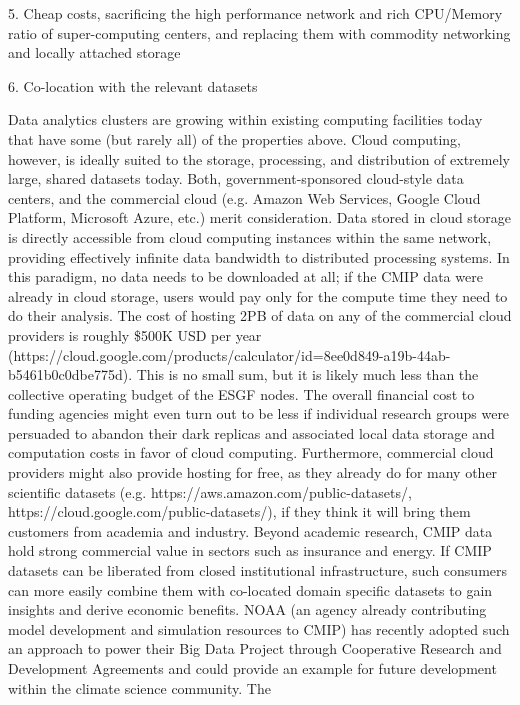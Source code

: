 \documentclass[gmd,manuscript]{copernicus}
\begin{document}
\begin{enumerate}[label=SC1-\arabic*,leftmargin=*]
  5. Cheap costs, sacrificing the high performance network and rich
  CPU/Memory ratio of super-computing centers, and replacing them with
  commodity networking and locally attached storage

  6. Co-location with the relevant datasets

  Data analytics clusters are growing within existing computing
  facilities today that have some (but rarely all) of the properties
  above. Cloud computing, however, is ideally suited to the storage,
  processing, and distribution of extremely large, shared datasets
  today. Both, government-sponsored cloud-style data centers, and the
  commercial cloud (e.g. Amazon Web Services, Google Cloud Platform,
  Microsoft Azure, etc.) merit consideration. Data stored in cloud
  storage is directly accessible from cloud computing instances within
  the same network, providing effectively infinite data bandwidth to
  distributed processing systems. In this paradigm, no data needs to
  be downloaded at all; if the CMIP data were already in cloud
  storage, users would pay only for the compute time they need to do
  their analysis. The cost of hosting 2PB of data on any of the
  commercial cloud providers is roughly \$500K USD per year
  (https://cloud.google.com/products/calculator/id=8ee0d849-a19b-44ab-b5461b0c0dbe775d).
  This is no small sum, but it is likely much less than the collective
  operating budget of the ESGF nodes. The overall financial cost to
  funding agencies might even turn out to be less if individual
  research groups were persuaded to abandon their dark replicas and
  associated local data storage and computation costs in favor of
  cloud computing. Furthermore, commercial cloud providers might also
  provide hosting for free, as they already do for many other
  scientific datasets (e.g. https://aws.amazon.com/public-datasets/,
  https://cloud.google.com/public-datasets/), if they think it will
  bring them customers from academia and industry. Beyond academic
  research, CMIP data hold strong commercial value in sectors such as
  insurance and energy. If CMIP datasets can be liberated from closed
  institutional infrastructure, such consumers can more easily combine
  them with co-located domain specific datasets to gain insights and
  derive economic benefits. NOAA (an agency already contributing model
  development and simulation resources to CMIP) has recently adopted
  such an approach to power their Big Data Project through Cooperative
  Research and Development Agreements and could provide an example for
  future development within the climate science community. The

\end{enumerate}
\end{document}
